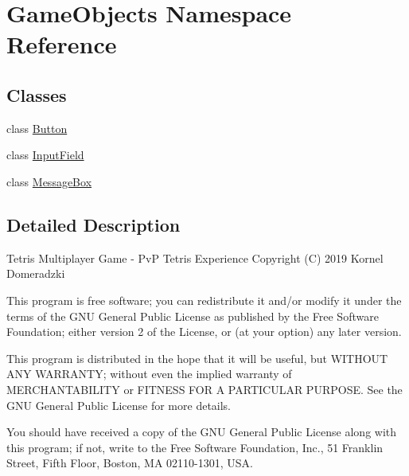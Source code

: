 \hypertarget{namespace_game_objects}{}\section{Game\+Objects Namespace Reference}
\label{namespace_game_objects}
\subsection*{Classes}
\begin{DoxyCompactItemize}
\item 
class \mbox{\hyperlink{class_game_objects_1_1_button}{Button}}
\item 
class \mbox{\hyperlink{class_game_objects_1_1_input_field}{Input\+Field}}
\item 
class \mbox{\hyperlink{class_game_objects_1_1_message_box}{Message\+Box}}
\end{DoxyCompactItemize}


\subsection{Detailed Description}
Tetris Multiplayer Game -\/ PvP Tetris Experience Copyright (C) 2019 Kornel Domeradzki

This program is free software; you can redistribute it and/or modify it under the terms of the G\+NU General Public License as published by the Free Software Foundation; either version 2 of the License, or (at your option) any later version.

This program is distributed in the hope that it will be useful, but W\+I\+T\+H\+O\+UT A\+NY W\+A\+R\+R\+A\+N\+TY; without even the implied warranty of M\+E\+R\+C\+H\+A\+N\+T\+A\+B\+I\+L\+I\+TY or F\+I\+T\+N\+E\+SS F\+OR A P\+A\+R\+T\+I\+C\+U\+L\+AR P\+U\+R\+P\+O\+SE. See the G\+NU General Public License for more details.

You should have received a copy of the G\+NU General Public License along with this program; if not, write to the Free Software Foundation, Inc., 51 Franklin Street, Fifth Floor, Boston, MA 02110-\/1301, U\+SA. 
